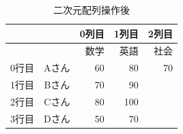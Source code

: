 \documentclass[11pt,a4paper,dvipdfmx,titlepage]{jsreport}
\begin{document}
\begin{table}[h]
 \begin{center}
    \caption{二次元配列操作後}
\begin{tabular}{r|c|r|r|r|} 
 & & 0列目 &1列目& 2列目\\ \hline 
 & &数学&英語&社会\\ \hline \hline
0行目 &Aさん &  60& 80 & 70 \\ \hline
1行目 &Bさん &  70& 90 & \\ \hline
2行目 &Cさん &  80& 100 & \\ \hline
3行目 &Dさん &  50& 70 & \\ \hline
\end{tabular}
\end{center}
\end{table}

\newpage
\end{document}
